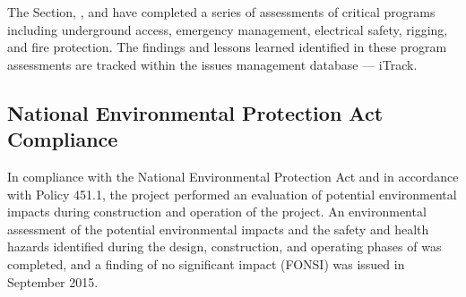 The \fnal {} Section, , and
  have completed a series of assessments of
critical   programs including underground access,
emergency management, electrical safety, rigging, and fire
protection. The findings and lessons learned identified in these
 program assessments are tracked within the \fnal issues management
database --- iTrack.

\subsection{National Environmental Protection Act Compliance}  

In compliance with the National Environmental Protection Act and in
accordance with  Policy 451.1, the
 project performed an evaluation of potential
environmental impacts during construction and operation of the
project.  An environmental assessment %
of the potential environmental impacts and the safety and health hazards
identified during the design, construction, and operating phases of
 was completed, and
a finding of no significant impact (FONSI) was issued in September 2015.


\begin{comment}
\subsection{Work Planning and Controls}
\label{sec:es-tc-eshq-har}
\fixme{ this was titled `Hazard Identification,' but has this other title in TC vol}

\fixme{I'm not sure what you want here; I mostly left the old text. anne}
A key element of an effective \dword{esh} program is identifying hazards. All work activities
shall be subject to work planning and hazard analysis.  
Once a list of hazards has been compiled for a facility, these hazards can be screened
and managed through a suitable set of controls.

The \dword{lbnf-dune} project completed a Hazard Analysis Report (\dword{har})
to ensure that identified hazards are mitigated early in the
design process.  The focus of the report is process hazards,
not activity hazards, which are typically covered in a job hazard
analysis.  The \dword{har}  identifies
hazards anticipated in the project's construction and operational
phases, proposes ways to mitigate the hazards to reduce risk, and establishes a
post-mitigation risk category for each.  As the \dword{dune} design 
matures, the \dword{har} will be
updated to ensure that all hazards are properly identified and
controlled through design and safety management programs.
\end{comment}


